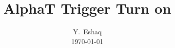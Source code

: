 \documentclass{beamer}
\begin{document}
\title{AlphaT Trigger Turn on}
\author{Y.~Eshaq\\
  \today}
\date{}
\frame{\titlepage}
%
\end{document}
